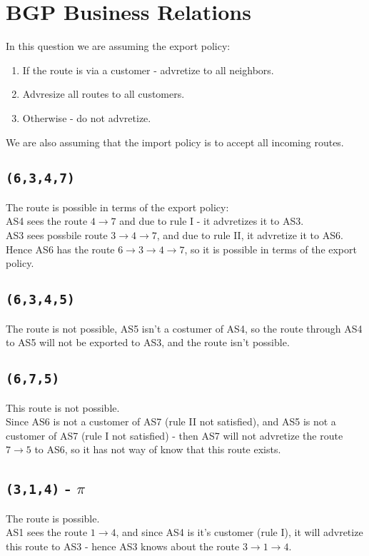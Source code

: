 \section{BGP Business Relations}
In this question we are assuming the export policy:
\begin{enumerate}[label=\textbf{\Roman*.}]
    \item If the route is via a customer - advretize to all neighbors.
    \item Advresize all routes to all customers.
    \item Otherwise - do not advretize.
\end{enumerate}
We are also assuming that the import policy is to accept all incoming routes.

\subsection{\texttt{(6,3,4,7)}}
The route is possible in terms of the export policy:\\
AS4 sees the route $4\rightarrow 7$ and due to rule I - it advretizes
it to AS3.\\
AS3 sees possbile route $3\rightarrow 4\rightarrow 7$, and due to rule II,
it advretize it to AS6.\\
Hence AS6 has the route $6\rightarrow 3\rightarrow 4\rightarrow 7$,
so it is possible in terms of the export policy.

\subsection{\texttt{(6,3,4,5)}}
The route is not possible, AS5 isn't a costumer 
of AS4, so the route through AS4 to AS5 will not be exported 
to AS3, and the route isn't possible.

\subsection{\texttt{(6,7,5)}}
This route is not possible.\\
Since AS6 is not a customer of AS7 (rule II not satisfied), and AS5 is not a customer
of AS7 (rule I not satisfied) - then AS7 will not advretize the route $7\rightarrow 5$
to AS6, so it has not way of know that this route exists.

\subsection{\texttt{(3,1,4)} - $\pi$}
The route is possible.\\
AS1 sees the route $1\rightarrow 4$,
and since AS4 is it's customer (rule I), it will advretize this route to AS3 -
hence AS3 knows about the route $3\rightarrow 1\rightarrow 4$.

